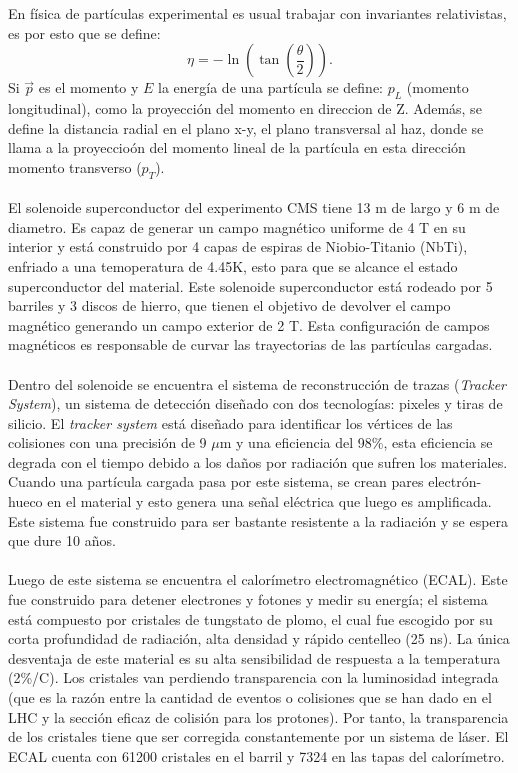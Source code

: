En física de partículas experimental es usual trabajar con invariantes relativistas, es por esto que se define:
\begin{equation}
	\eta=-\ln\left(\tan\left(\frac{\theta}{2}\right) \right).
\end{equation} 	
Si $\vec{p}$ es el momento y $E$ la energía de una partícula se define: $p_L$ (momento longitudinal), como la proyección del momento en direccion de Z. Además, se define la distancia radial en el plano x-y, el plano transversal al haz, donde se llama a la proyeccioón del momento lineal de la partícula en esta dirección momento transverso ($p_T$).  
\\
\\
El solenoide superconductor del experimento CMS tiene 13 m de largo y 6 m de diametro. Es capaz de generar un campo magnético uniforme de 4 T en su interior y está construido por 4 capas de espiras de Niobio-Titanio (NbTi), enfriado a una temoperatura de 4.45K, esto para que se alcance el estado superconductor del material. Este solenoide superconductor está rodeado por 5 barriles y 3 discos de hierro, que tienen el objetivo de devolver el campo magnético generando un campo exterior de 2 T.  Esta configuración de campos magnéticos es responsable de curvar las trayectorias de las partículas cargadas.
\\
\\
Dentro del solenoide se encuentra el sistema de reconstrucción de trazas (\textit{Tracker System}), un sistema de detección diseñado con dos tecnologías: pixeles y tiras de silicio. El \textit{tracker system} está diseñado para identificar los vértices de las colisiones con una precisión de 9 $\mu$m y una eficiencia del 98\%, esta eficiencia se degrada con el tiempo debido a los daños por radiación que sufren los materiales. Cuando una partícula cargada pasa por este sistema, se crean pares electrón-hueco en el material y esto genera una señal eléctrica que luego es amplificada. Este sistema fue construido para ser bastante resistente a la radiación y se espera que dure 10 años.
\\
\\
Luego de este sistema se encuentra el calorímetro electromagnético (ECAL). Este fue construido para detener electrones y fotones y medir su energía; el sistema está compuesto por cristales de tungstato de plomo, el cual fue escogido por su corta profundidad de radiación, alta densidad y rápido centelleo (25 ns). La única desventaja de este material es su alta sensibilidad de respuesta a la temperatura (2\%/C). Los cristales van perdiendo transparencia con la luminosidad integrada (que es la razón entre la cantidad de eventos o colisiones que se han dado en el LHC y la sección eficaz de colisión para los protones\cite{RuizAlvarez:2016mhn}). Por tanto, la transparencia de los cristales tiene que ser corregida constantemente por un sistema de láser. El ECAL cuenta con 61200 cristales en el barril y 7324 en las tapas del calorímetro.
